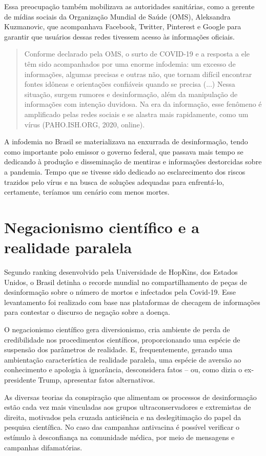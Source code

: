 Essa preocupação também mobilizava as autoridades sanitárias, como a
gerente de mídias sociais da Organização Mundial de Saúde (OMS),
Aleksandra Kuzmanovic, que acompanhava Facebook, Twitter, Pinterest e
Google para garantir que usuários dessas redes tivessem acesso às
informações oficiais.

\begin{quote}
Conforme declarado pela OMS, o surto de COVID-19 e a resposta a ele têm
sido acompanhados por uma enorme infodemia: um excesso de informações,
algumas precisas e outras não, que tornam difícil encontrar fontes
idôneas e orientações confiáveis quando se precisa (...) Nessa situação,
surgem rumores e desinformação, além da manipulação de informações com
intenção duvidosa. Na era da informação, esse fenômeno é amplificado
pelas redes sociais e se alastra mais rapidamente, como um vírus
(PAHO.ISH.ORG, 2020, online).
\end{quote}

A infodemia no Brasil se materializava na enxurrada de desinformação,
tendo como importante polo emissor o governo federal, que passava mais
tempo se dedicando à produção e disseminação de mentiras e informações
destorcidas sobre a pandemia. Tempo que se tivesse sido dedicado ao
esclarecimento dos riscos trazidos pelo vírus e na busca de soluções
adequadas para enfrentá-lo, certamente, teríamos um cenário com menos
mortes.

\section{Negacionismo científico e a realidade paralela}

Segundo ranking desenvolvido pela Universidade de HopKins, dos Estados
Unidos, o Brasil detinha o recorde mundial no compartilhamento de peças
de desinformação sobre o número de mortos e infectados pela Covid-19.
Esse levantamento foi realizado com base nas plataformas de checagem de
informações para contestar o discurso de negação sobre a doença.

O negacionismo científico gera diversionismo, cria ambiente de perda de
credibilidade nos procedimentos científicos, proporcionando uma espécie
de suspensão dos parâmetros de realidade. E, frequentemente, gerando uma
ambientação característica de realidade paralela, uma espécie de aversão
ao conhecimento e apologia à ignorância, desconsidera fatos -- ou, como
dizia o ex-presidente Trump, apresentar fatos alternativos.

As diversas teorias da conspiração que alimentam os processos de
desinformação estão cada vez mais vinculadas aos grupos
ultraconservadores e extremistas de direita, motivados pela cruzada
anticiência e na deslegitimação do papel da pesquisa científica. No caso
das campanhas antivacina é possível verificar o estímulo à desconfiança
na comunidade médica, por meio de mensagens e campanhas difamatórias.

